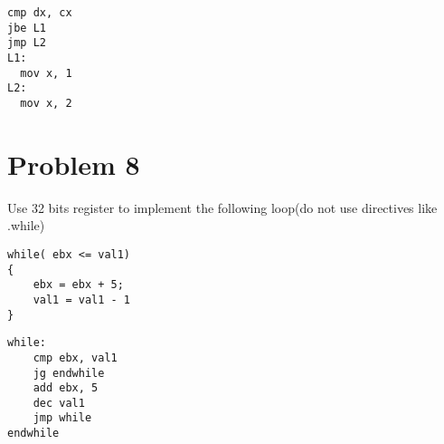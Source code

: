 \documentclass[paper=a4, fontsize=11pt]{scrartcl} %
\numberwithin{equation}{section} %
\numberwithin{figure}{section} %
\numberwithin{table}{section} %
\begin{document}
\begin{lstlisting}[language={[ANSI]C}]
cmp dx, cx
jbe L1
jmp L2
L1:
  mov x, 1
L2:
  mov x, 2
\end{lstlisting}


\section{Problem 8}
Use 32 bits register to implement the following loop(do not use directives like .while)\\
\begin{lstlisting}[language={[ANSI]C}]
while( ebx <= val1)
{
	ebx = ebx + 5;
	val1 = val1 - 1
}
\end{lstlisting}
\begin{lstlisting}[language={[ANSI]C}]
while:
    cmp ebx, val1
    jg endwhile
    add ebx, 5
    dec val1
    jmp while
endwhile
\end{lstlisting}
\end{document}

